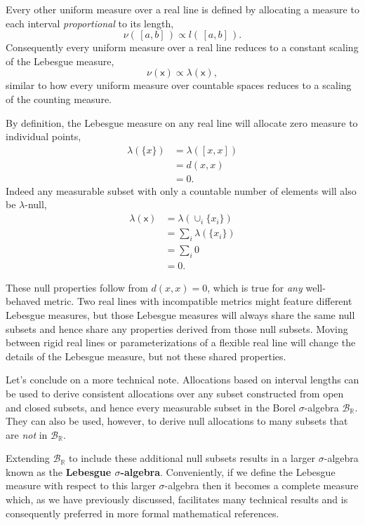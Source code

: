 \documentclass[
  letterpaper,
  DIV=11,
  numbers=noendperiod]{scrartcl}
\begin{document}
Every other uniform measure over a real line is defined by allocating a
measure to each interval \emph{proportional} to its length, \[
\nu( \, [a, b] \, ) \propto l( \, [a, b] \, ).
\] Consequently every uniform measure over a real line reduces to a
constant scaling of the Lebesgue measure, \[
\nu ( \mathsf{x} ) \propto \lambda ( \mathsf{x} ),
\] similar to how every uniform measure over countable spaces reduces to
a scaling of the counting measure.

By definition, the Lebesgue measure on any real line will allocate zero
measure to individual points, \begin{align*}
\lambda(\{ x \})
&= \lambda([x, x])
\\
&= d(x, x)
\\
&= 0.
\end{align*} Indeed any measurable subset with only a countable number
of elements will also be \(\lambda\)-null, \begin{align*}
\lambda(\mathsf{x})
&=
\lambda(\cup_{i} \{ x_{i} \} )
\\
&=
\sum_{i} \lambda( \{ x_{i} \} )
\\
&=
\sum_{i} 0
\\
&=
0.
\end{align*}

These null properties follow from \(d(x, x) = 0\), which is true for
\emph{any} well-behaved metric. Two real lines with incompatible metrics
might feature different Lebesgue measures, but those Lebesgue measures
will always share the same null subsets and hence share any properties
derived from those null subsets. Moving between rigid real lines or
parameterizations of a flexible real line will change the details of the
Lebesgue measure, but not these shared properties.

Let's conclude on a more technical note. Allocations based on interval
lengths can be used to derive consistent allocations over any subset
constructed from open and closed subsets, and hence every measurable
subset in the Borel \(\sigma\)-algebra \(\mathcal{B}_{\mathbb{R}}\).
They can also be used, however, to derive null allocations to many
subsets that are \emph{not} in \(\mathcal{B}_{\mathbb{R}}\).

Extending \(\mathcal{B}_{\mathbb{R}}\) to include these additional null
subsets results in a larger \(\sigma\)-algebra known as the
\textbf{Lebesgue \(\sigma\)-algebra}. Conveniently, if we define the
Lebesgue measure with respect to this larger \(\sigma\)-algebra then it
becomes a complete measure which, as we have previously discussed,
facilitates many technical results and is consequently preferred in more
formal mathematical references.
\end{document}
